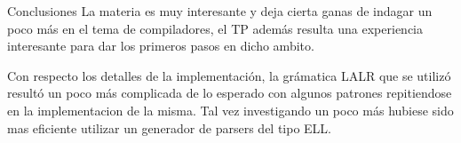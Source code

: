 \documentclass[a4paper,8pt]{article}
\begin{document}
\newpage
\begin{section}{Conclusiones}
La materia es muy interesante y deja cierta ganas de indagar un poco más en el tema de compiladores, el TP además resulta una experiencia interesante para dar los primeros pasos en dicho ambito.

Con respecto los detalles de la implementación, la grámatica LALR que se utilizó resultó un poco más complicada de lo esperado con algunos patrones repitiendose en la implementacion de la misma. Tal vez investigando un poco más hubiese sido mas eficiente utilizar un generador de parsers del tipo ELL.
\end{section}
\newpage
\end{document}
